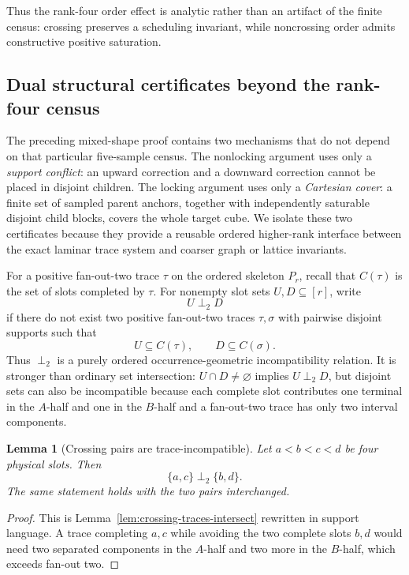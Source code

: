 \documentclass[11pt]{article}
\newtheorem{lemma}[definition]{Lemma}
\begin{document}
Thus the rank-four order effect is analytic rather than an artifact of the
finite census: crossing preserves a scheduling invariant, while noncrossing
order admits constructive positive saturation.

\subsection{Dual structural certificates beyond the rank-four census}
\label{subsec:dual-certificates}

The preceding mixed-shape proof contains two mechanisms that do not depend on
that particular five-sample census.  The nonlocking argument uses only a
\emph{support conflict}: an upward correction and a downward correction cannot
be placed in disjoint children.  The locking argument uses only a
\emph{Cartesian cover}: a finite set of sampled parent anchors, together with
independently saturable disjoint child blocks, covers the whole target cube.
We isolate these two certificates because they provide a reusable ordered
higher-rank interface between the exact laminar trace system and coarser graph
or lattice invariants.

For a positive fan-out-two trace $\tau$ on the ordered skeleton $P_r$, recall
that $C(\tau)$ is the set of slots completed by $\tau$.  For nonempty slot sets
$U,D\subseteq[r]$, write
\[
 U\perp_2 D
\]
if there do not exist two positive fan-out-two traces $\tau,\sigma$ with
pairwise disjoint supports such that
\[
 U\subseteq C(\tau),\qquad D\subseteq C(\sigma).
\]
Thus $\perp_2$ is a purely ordered occurrence-geometric incompatibility
relation.  It is stronger than ordinary set intersection: $U\cap D\ne\varnothing$
implies $U\perp_2 D$, but disjoint sets can also be incompatible because each
complete slot contributes one terminal in the $A$-half and one in the
$B$-half and a fan-out-two trace has only two interval components.

\begin{lemma}[Crossing pairs are trace-incompatible]
\label{lem:crossing-pairs-incompatible}
Let $a<b<c<d$ be four physical slots.  Then
\[
 \{a,c\}\perp_2\{b,d\}.
\]
The same statement holds with the two pairs interchanged.
\end{lemma}

\begin{proof}
This is Lemma~\ref{lem:crossing-traces-intersect} rewritten in support language.
A trace completing $a,c$ while avoiding the two complete slots $b,d$ would
need two separated components in the $A$-half and two more in the $B$-half,
which exceeds fan-out two.
\end{proof}
\end{document}
